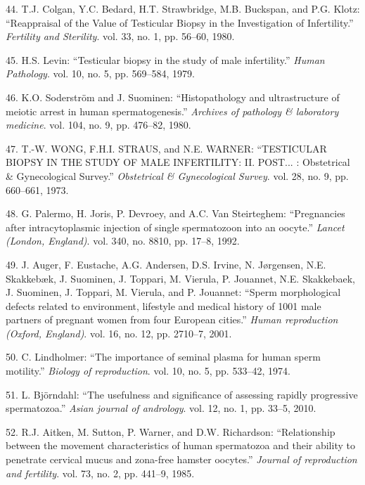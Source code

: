 \documentclass[12pt,a4paper,twoside]{ugathesis}
\theoremstyle{definition}
\theoremstyle{definition}
\theoremstyle{definition}
\theoremstyle{remark}
\begin{document}
\hypertarget{ref-Colgan1980}{}
44. T.J. Colgan, Y.C. Bedard, H.T. Strawbridge, M.B. Buckspan, and P.G.
Klotz: ``Reappraisal of the Value of Testicular Biopsy in the
Investigation of Infertility.'' \emph{Fertility and Sterility}. vol. 33,
no. 1, pp. 56--60, 1980.

\hypertarget{ref-Levin1979}{}
45. H.S. Levin: ``Testicular biopsy in the study of male infertility.''
\emph{Human Pathology}. vol. 10, no. 5, pp. 569--584, 1979.

\hypertarget{ref-Soderstrom1980}{}
46. K.O. Soderström and J. Suominen: ``Histopathology and ultrastructure
of meiotic arrest in human spermatogenesis.'' \emph{Archives of
pathology \& laboratory medicine}. vol. 104, no. 9, pp. 476--82, 1980.

\hypertarget{ref-WONG1973}{}
47. T.-W. WONG, F.H.I. STRAUS, and N.E. WARNER: ``TESTICULAR BIOPSY IN
THE STUDY OF MALE INFERTILITY: II. POST... : Obstetrical \&
Gynecological Survey.'' \emph{Obstetrical \& Gynecological Survey}. vol.
28, no. 9, pp. 660--661, 1973.

\hypertarget{ref-Palermo1992}{}
48. G. Palermo, H. Joris, P. Devroey, and A.C. Van Steirteghem:
``Pregnancies after intracytoplasmic injection of single spermatozoon
into an oocyte.'' \emph{Lancet (London, England)}. vol. 340, no. 8810,
pp. 17--8, 1992.

\hypertarget{ref-Auger2001}{}
49. J. Auger, F. Eustache, A.G. Andersen, D.S. Irvine, N. Jørgensen,
N.E. Skakkebæk, J. Suominen, J. Toppari, M. Vierula, P. Jouannet, N.E.
Skakkebaek, J. Suominen, J. Toppari, M. Vierula, and P. Jouannet:
``Sperm morphological defects related to environment, lifestyle and
medical history of 1001 male partners of pregnant women from four
European cities.'' \emph{Human reproduction (Oxford, England)}. vol. 16,
no. 12, pp. 2710--7, 2001.

\hypertarget{ref-Lindholmer1974}{}
50. C. Lindholmer: ``The importance of seminal plasma for human sperm
motility.'' \emph{Biology of reproduction}. vol. 10, no. 5, pp. 533--42,
1974.

\hypertarget{ref-Bjorndahl2010}{}
51. L. Björndahl: ``The usefulness and significance of assessing rapidly
progressive spermatozoa.'' \emph{Asian journal of andrology}. vol. 12,
no. 1, pp. 33--5, 2010.

\hypertarget{ref-Aitken1985}{}
52. R.J. Aitken, M. Sutton, P. Warner, and D.W. Richardson:
``Relationship between the movement characteristics of human spermatozoa
and their ability to penetrate cervical mucus and zona-free hamster
oocytes.'' \emph{Journal of reproduction and fertility}. vol. 73, no. 2,
pp. 441--9, 1985.
\end{document}
